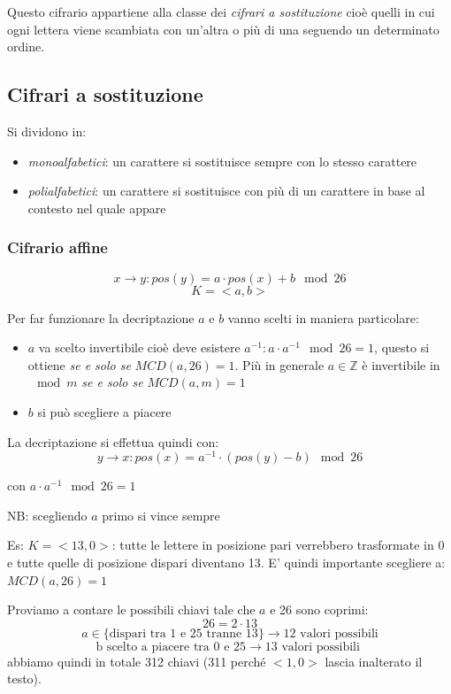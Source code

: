 Questo cifrario appartiene alla classe dei \emph{cifrari a sostituzione} cioè quelli in cui ogni lettera viene scambiata con un'altra o più di una seguendo un determinato ordine.

\subsection{Cifrari a sostituzione}
Si dividono in:
\begin{itemize}
    \item \emph{monoalfabetici}: un carattere si sostituisce sempre con lo stesso carattere
    \item \emph{polialfabetici}: un carattere si sostituisce con più di un carattere in base al contesto nel quale appare
\end{itemize}

\subsubsection{Cifrario affine}
$$ x \xrightarrow{} y : pos\left(y\right) = a \cdot pos\left(x\right) + b \mod 26 $$
$$ K = <a, b> $$

Per far funzionare la decriptazione $a$ e $b$ vanno scelti in maniera particolare:
\begin{itemize}
    \item $a$ va scelto invertibile cioè deve esistere $a^{-1} : a \cdot a^{-1} \mod 26 = 1$, questo si ottiene \emph{se e solo se} $MCD(a, 26) = 1$. Più in generale $a \in \mathbb{Z}$ è invertibile in $\mod m$ \emph{se e solo se} $MCD(a, m)=1$
    \item $b$ si può scegliere a piacere
\end{itemize}

La decriptazione si effettua quindi con:
$$ y \xrightarrow{} x : pos\left(x\right) = a^{-1} \cdot (pos\left(y\right) - b) \mod 26 $$

con $a \cdot a^{-1} \mod 26 = 1$

NB: scegliendo $a$ primo si vince sempre

Es: $K = <13, 0>$: tutte le lettere in posizione pari verrebbero trasformate in 0 e tutte quelle di posizione dispari diventano 13. E' quindi importante scegliere a: $MCD(a, 26)=1$

Proviamo a contare le possibili chiavi tale che $a$ e 26 sono coprimi:
$$ 26 = 2 \cdot 13 $$
$$ a \in \{ \text{dispari tra 1 e 25 tranne 13} \} \xrightarrow{} 12 \text{ valori possibili} $$
$$ \text{b scelto a piacere tra 0 e 25} \xrightarrow{} 13 \text{ valori possibili } $$
abbiamo quindi in totale 312 chiavi (311 perché $<1,0>$ lascia inalterato il testo).

